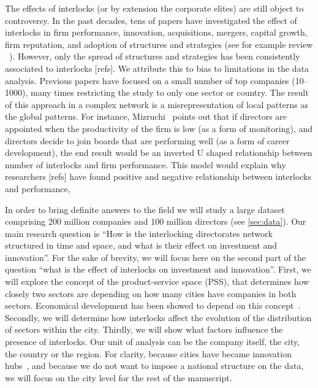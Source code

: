 The effects of interlocks (or by extension the corporate elites) are still object to controversy. 
In the past decades, tens of papers have investigated the effect of interlocks in firm performance, innovation, acquisitions, mergers, capital growth, firm reputation, and adoption of structures and strategies (see for example review ~\cite{Mizruchi1996}).
However, only the spread of structures and strategies has been consistently associated to interlocks [refs].
We attribute this to bias to limitations in the data analysis.
Previous papers have focused on a small number of top companies (10--1000), 
many times restricting the study to only one sector or country. 
The result of this approach in a complex network is a misrepresentation of local patterns as the global patterns.
For instance, Mizruchi~\cite{Mizruchi1996} points out that if directors are appointed when the productivity of the firm is low (as a form of monitoring),
and directors decide to join boards that are performing well (as a form of career development),
the end result would be an inverted U shaped relationship between number of interlocks and firm performance. 
This model would explain why researchers [refs] have found positive and negative relationship between interlocks and performance,

In order to bring definite answers to the field we will study a large dataset comprising 200 million companies and 100 million directors (see \ref{sec:data}).
Our main research question is ``How is the interlocking directorates network structured in time and space, and what is their effect on investment and innovation''.
For the sake of brevity, we will focus here on the second part of the question ``what is the effect of interlocks on investment and innovation''. 
First, we will explore the concept of the product-service space (PSS), 
that determines how closely two sectors are depending on how many cities have companies in both sectors.
Economical development has been showed to depend on this concept~\citep{hidalgo2009}.
Secondly, we will determine how interlocks affect the evolution of the distribution of sectors within the city.
Thirdly, we will show what factors influence the presence of interlocks.
Our unit of analysis can be the company itself, the city, the country or the region. 
For clarity, because cities have became innovation hubs~\citep{Belderbos2014}, 
and because we do not want to impose a national structure on the data,
we will focus on the city level for the rest of the manuscript.


